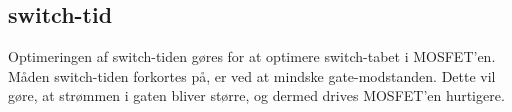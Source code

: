 
\subsection{switch-tid}
Optimeringen af switch-tiden gøres for at optimere switch-tabet i MOSFET'en. Måden switch-tiden forkortes på, er ved at mindske gate-modstanden. Dette vil gøre, at strømmen i gaten bliver større, og dermed drives MOSFET'en hurtigere. 

 